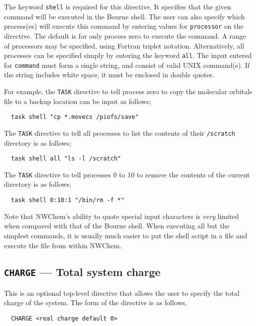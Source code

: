 The keyword \verb+shell+ is required for this directive.  It specifies
that the given command will be executed in the Bourne shell.  The user
can also specify which process(es) will execute this command by
entering values for \verb+processor+ on the directive.  The default is
for only process zero to execute the command.  A range of processors
may be specified, using Fortran triplet notation.  Alternatively, all
processes can be specified simply by entering the keyword \verb+all+.
The input entered for \verb+command+ must form a single string, and
consist of valid UNIX command(s).  If the string includes white space,
it must be enclosed in double quotes.

For example, the \verb+TASK+ directive to tell process zero to copy the 
molecular orbitals file to a backup location can be input as follows;

\begin{verbatim}
  task shell "cp *.movecs /piofs/save"
\end{verbatim}

The \verb+TASK+ directive to tell all processes to list the contents of 
their \verb+/scratch+ directory is as follows;

\begin{verbatim}
  task shell all "ls -l /scratch"
\end{verbatim}

The \verb+TASK+ directive to tell processes 0 to 10 to remove the 
contents of the current directory is as follows;

\begin{verbatim}
  task shell 0:10:1 "/bin/rm -f *"
\end{verbatim}

Note that NWChem's ability to quote special input characters is {\em
  very} limited when compared with that of the Bourne shell.  When
executing all but the simplest commands, it is usually much easier to
put the shell script in a file and execute the file from within
NWChem.

\subsection{{\tt CHARGE} --- Total system charge}
\label{sec:charge}

This is an optional top-level directive that allows the user to specify
the total charge of the system.  The form of the directive is as follows,
\begin{verbatim}
  CHARGE <real charge default 0>
\end{verbatim}

